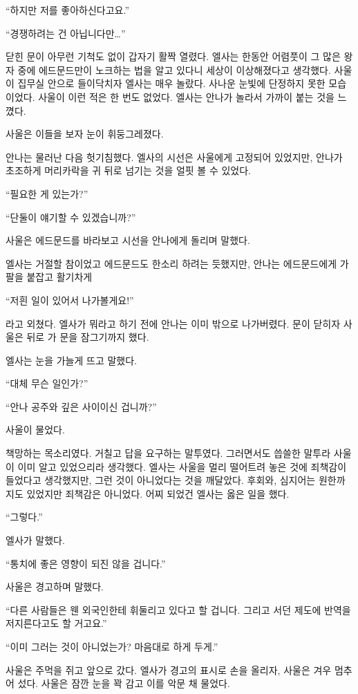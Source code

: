 ``하지만 저를 좋아하신다고요.''

``경쟁하려는 건 아닙니다만\ldots''

닫힌 문이 아무런 기척도 없이 갑자기 활짝 열렸다. 엘사는 한동안 어렴풋이 그 많은 왕자 중에 에드문드만이 노크하는 법을 알고 있다니 세상이 이상해졌다고 생각했다. 사울이 집무실 안으로 들이닥치자 엘사는 매우 놀랐다. 사나운 눈빛에 단정하지 못한 모습이었다. 사울이 이런 적은 한 번도 없었다. 엘사는 안나가 놀라서 가까이 붙는 것을 느꼈다.

사울은 이들을 보자 눈이 휘둥그레졌다.

안나는 물러난 다음 헛기침했다. 엘사의 시선은 사울에게 고정되어 있었지만, 안나가 초조하게 머리카락을 귀 뒤로 넘기는 것을 얼핏 볼 수 있었다.

``필요한 게 있는가?''

``단둘이 얘기할 수 있겠습니까?''

사울은 에드문드를 바라보고 시선을 안나에게 돌리며 말했다.

엘사는 거절할 참이었고 에드문드도 한소리 하려는 듯했지만, 안나는 에드문드에게 가 팔을 붙잡고 활기차게

``저흰 일이 있어서 나가볼게요!''

라고 외쳤다. 엘사가 뭐라고 하기 전에 안나는 이미 밖으로 나가버렸다. 문이 닫히자 사울은 뒤로 가 문을 잠그기까지 했다.

엘사는 눈을 가늘게 뜨고 말했다.

``대체 무슨 일인가?''

``안나 공주와 깊은 사이이신 겁니까?''

사울이 물었다.

책망하는 목소리였다. 거칠고 답을 요구하는 말투였다. 그러면서도 씁쓸한 말투라 사울이 이미 알고 있었으리라 생각했다. 엘사는 사울을 멀리 떨어트려 놓은 것에 죄책감이 들었다고 생각했지만, 그런 것이 아니었다는 것을 깨달았다. 후회와, 심지어는 원한까지도 있었지만 죄책감은 아니었다. 어찌 되었건 엘사는 옳은 일을 했다.

``그렇다.''

엘사가 말했다.

``통치에 좋은 영향이 되진 않을 겁니다.''

사울은 경고하며 말했다.

``다른 사람들은 웬 외국인한테 휘둘리고 있다고 할 겁니다. 그리고 서던 제도에 반역을 저지른다고도 할 거고요.''

``이미 그러는 것이 아니었는가? 마음대로 하게 두게.''

사울은 주먹을 쥐고 앞으로 갔다. 엘사가 경고의 표시로 손을 올리자, 사울은 겨우 멈추어 섰다. 사울은 잠깐 눈을 꽉 감고 이를 악문 채 물었다.

